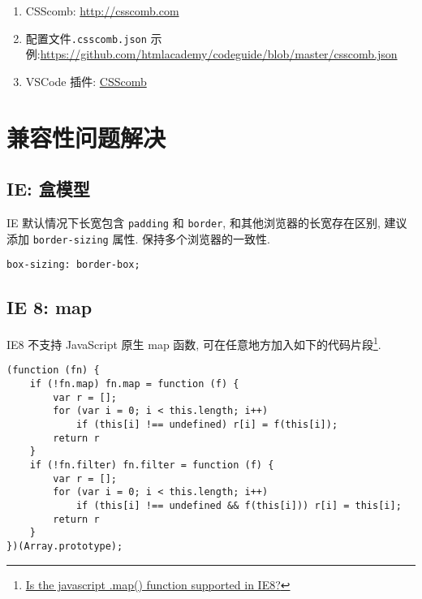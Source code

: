 \begin{enumerate}
\def\labelenumi{\arabic{enumi}.}
\tightlist
\item
  CSScomb: \url{http://csscomb.com}
\item
  配置文件\lstinline!.csscomb.json!
  示例:\url{https://github.com/htmlacademy/codeguide/blob/master/csscomb.json}
\item
  VSCode 插件:
  \href{https://marketplace.visualstudio.com/items?itemName=mrmlnc.vscode-csscomb}{CSScomb}
\end{enumerate}

\section{兼容性问题解决}\label{ux517cux5bb9ux6027ux95eeux9898ux89e3ux51b3}

\subsection{IE: 盒模型}\label{ie-ux76d2ux6a21ux578b}

IE 默认情况下长宽包含 \lstinline!padding! 和 \lstinline!border!,
和其他浏览器的长宽存在区别, 建议添加 \lstinline!border-sizing! 属性.
保持多个浏览器的一致性.

\begin{lstlisting}
box-sizing: border-box;
\end{lstlisting}

\subsection{IE 8: map}\label{ie-8-map}

IE8 不支持 JavaScript 原生 map 函数,
可在任意地方加入如下的代码片段\footnote{\href{http://stackoverflow.com/questions/7350912/is-the-javascript-map-function-supported-in-ie8}{Is
  the javascript .map() function supported in IE8?}}.

\begin{lstlisting}
(function (fn) {
    if (!fn.map) fn.map = function (f) {
        var r = [];
        for (var i = 0; i < this.length; i++)
            if (this[i] !== undefined) r[i] = f(this[i]);
        return r
    }
    if (!fn.filter) fn.filter = function (f) {
        var r = [];
        for (var i = 0; i < this.length; i++)
            if (this[i] !== undefined && f(this[i])) r[i] = this[i];
        return r
    }
})(Array.prototype);
\end{lstlisting}

